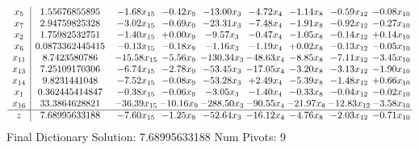 \documentclass[9pt]{article}
\begin{document}
 \[\begin{array}{c| c c@{\hskip 2pt} c@{\hskip 2pt} c@{\hskip 2pt} c@{\hskip 2pt} c@{\hskip 2pt} c@{\hskip 2pt} c@{\hskip 2pt} }
 x_{5}   &  1.55676855895 & -1.68 x_{15} & -0.42 x_{9} & -13.00 x_{3} & -4.72 x_{4} & -1.14 x_{8} & -0.59 x_{12} & -0.08 x_{10}\\
 x_{7}   &  2.94759825328 & -3.02 x_{15} & -0.69 x_{9} & -23.31 x_{3} & -7.48 x_{4} & -1.91 x_{8} & -0.92 x_{12} & -0.27 x_{10}\\
 x_{2}   &  1.75982532751 & -1.40 x_{15} & +  0.00 x_{9} & -9.57 x_{3} & -0.47 x_{4} & -1.05 x_{8} & -0.14 x_{12} & +  0.14 x_{10}\\
 x_{6}   &  0.0873362445415 & -0.13 x_{15} & -0.18 x_{9} & -1.16 x_{3} & -1.19 x_{4} & +  0.02 x_{8} & -0.13 x_{12} & -0.05 x_{10}\\
 x_{11}   &  8.7423580786 & -15.58 x_{15} & -5.56 x_{9} & -130.34 x_{3} & -48.63 x_{4} & -8.85 x_{8} & -7.11 x_{12} & -3.45 x_{10}\\
 x_{13}   &  7.25109170306 & -6.74 x_{15} & -2.78 x_{9} & -53.45 x_{3} & -17.05 x_{4} & -3.20 x_{8} & -3.13 x_{12} & -1.90 x_{10}\\
 x_{14}   &  9.8231441048 & -7.52 x_{15} & -0.08 x_{9} & -53.28 x_{3} & +  2.49 x_{4} & -5.39 x_{8} & -1.48 x_{12} & +  0.66 x_{10}\\
 x_{1}   &  0.362445414847 & -0.38 x_{15} & -0.06 x_{9} & -3.05 x_{3} & -1.40 x_{4} & -0.33 x_{8} & -0.04 x_{12} & -0.02 x_{10}\\
 x_{16}   &  33.3864628821 & -36.39 x_{15} & -10.16 x_{9} & -288.50 x_{3} & -90.55 x_{4} & -21.97 x_{8} & -12.83 x_{12} & -3.58 x_{10}\\
\hline
z    &  7.68995633188 & -7.60 x_{15} & -1.25 x_{9} & -52.64 x_{3} & -16.12 x_{4} & -4.76 x_{8} & -2.03 x_{12} & -0.71 x_{10}\\
\end{array}\]
Final Dictionary
Solution:  7.68995633188
Num Pivots:  9
\end{document}

